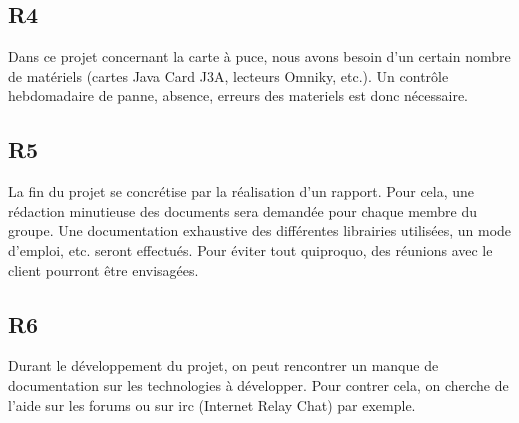 \documentclass[a4paper,11pt,french]{article}
\begin{document}
\subsection*{R4}
Dans ce projet concernant la carte à puce, nous avons besoin d'un certain nombre 
de matériels (cartes Java Card J3A, lecteurs Omniky, etc.). Un contrôle 
hebdomadaire de panne, absence, erreurs des materiels est donc nécessaire. 

\subsection*{R5}
La fin du projet se concrétise par la réalisation d'un rapport. Pour cela, une
rédaction minutieuse des documents sera demandée pour chaque membre du groupe.
Une documentation exhaustive des différentes librairies utilisées, un mode
d'emploi, etc. seront effectués. Pour éviter tout quiproquo, des réunions avec
le client pourront être envisagées.


\subsection*{R6}
Durant le développement du projet, on peut rencontrer un manque de 
documentation sur les technologies à développer. Pour contrer cela, on cherche de l'aide 
sur les forums ou sur irc (Internet Relay Chat) par exemple.
\end{document}
